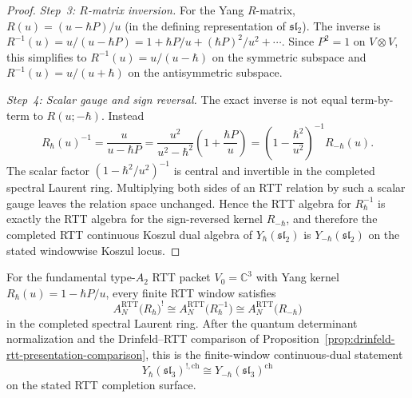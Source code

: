 \begin{proof}
\emph{Step~3: $R$-matrix inversion.}
For the Yang $R$-matrix, $R(u) = (u - \hbar P)/u$ (in the defining representation of $\mathfrak{sl}_2$). The inverse is $R^{-1}(u) = u/(u - \hbar P) = 1 + \hbar P/u + (\hbar P)^2/u^2 + \cdots$. Since $P^2 = 1$ on $V \otimes V$, this simplifies to $R^{-1}(u) = u/(u-\hbar)$ on the symmetric subspace and $R^{-1}(u) = u/(u+\hbar)$ on the antisymmetric subspace.

\emph{Step~4: Scalar gauge and sign reversal.}
The exact inverse is not equal term-by-term to $R(u;-\hbar)$.
Instead
\[
 R_\hbar(u)^{-1}
 = \frac{u}{u-\hbar P}
 = \frac{u^2}{u^2-\hbar^2}\left(1+\frac{\hbar P}{u}\right)
 = \left(1-\frac{\hbar^2}{u^2}\right)^{-1} R_{-\hbar}(u).
\]
The scalar factor $(1-\hbar^2/u^2)^{-1}$ is central and invertible
in the completed spectral Laurent ring. Multiplying both sides of an
RTT relation by such a scalar gauge leaves the relation space
unchanged. Hence the RTT algebra for $R_\hbar^{-1}$ is exactly the
RTT algebra for the sign-reversed kernel $R_{-\hbar}$, and therefore
the completed RTT continuous Koszul dual algebra of
$Y_\hbar(\mathfrak{sl}_2)$ is
$Y_{-\hbar}(\mathfrak{sl}_2)$ on the stated windowwise Koszul locus.
\end{proof}

\begin{corollary}
\label{cor:sl3-finite-rtt-dual}
For the fundamental type-$A_2$ RTT packet
$V_0=\mathbb C^3$ with Yang kernel
$R_\hbar(u)=1-\hbar P/u$, every finite RTT window satisfies
\[
A_N^{\mathrm{RTT}}\bigl(R_\hbar\bigr)^!
\cong
A_N^{\mathrm{RTT}}\bigl(R_\hbar^{-1}\bigr)
\cong
A_N^{\mathrm{RTT}}\bigl(R_{-\hbar}\bigr)
\]
in the completed spectral Laurent ring.  After the quantum determinant
normalization and the Drinfeld--RTT comparison
of Proposition~\ref{prop:drinfeld-rtt-presentation-comparison}, this
is the finite-window continuous-dual statement
\[
Y_\hbar(\mathfrak{sl}_3)^{!,\mathrm{ch}}
\cong
Y_{-\hbar}(\mathfrak{sl}_3)^{\mathrm{ch}}
\]
on the stated RTT completion surface.
\end{corollary}

